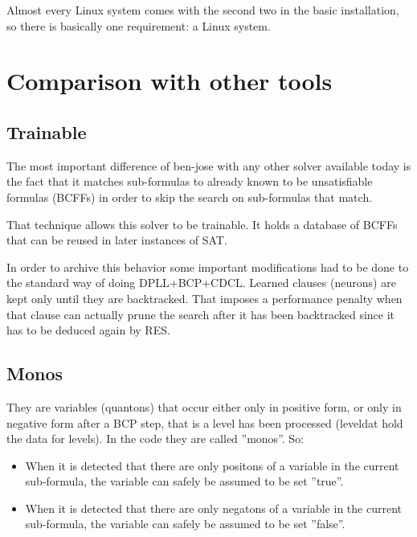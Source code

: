 \documentclass{easychair}
\newcommand{\neuron}{\textsf{neuron}}
\newcommand{\quanton}{\textsf{quanton}}
\newcommand{\leveldat}{\textsf{leveldat}}
\begin{document}
Almost every Linux system comes with the second two in the basic installation, so there is basically one requirement: a Linux system.

\section{Comparison with other tools}
\label{sect:comparison}

\subsection{Trainable}

The most important difference of ben-jose with any other solver available today is the fact that it matches sub-formulas to already known to be unsatisfiable formulas (BCFFs) in order to skip the search on sub-formulas that match.

That technique allows this solver to be trainable. It holds a database of BCFFs that can be reused in later instances of SAT.

In order to archive this behavior some important modifications had to be done to the standard way of doing DPLL+BCP+CDCL. Learned clauses ({\neuron}s) are kept only until they are backtracked. That imposes a performance penalty when that clause can actually prune the search after it has been backtracked since it has to be deduced again by RES.

\subsection{Monos}

They are variables ({\quanton}s) that occur either only in positive form, or only in negative form after a BCP step, that is a level has been processed ({\leveldat} hold the data for levels). In the code they are called ''monos''. So:

\begin{itemize}
\item
When it is detected that there are only positons of a variable in the current sub-formula, the variable can safely be assumed to be set ''true''. 

\item
When it is detected that there are only negatons of a variable in the current sub-formula, the variable can safely be assumed to be set ''false''. 
\end{itemize}
\end{document}
